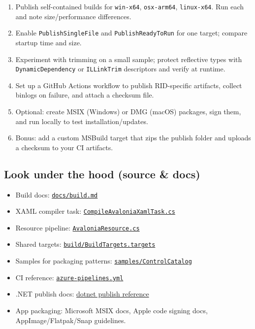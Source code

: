 \begin{enumerate}
\def\labelenumi{\arabic{enumi}.}
\tightlist
\item
  Publish self-contained builds for \passthrough{\lstinline!win-x64!},
  \passthrough{\lstinline!osx-arm64!},
  \passthrough{\lstinline!linux-x64!}. Run each and note
  size/performance differences.
\item
  Enable \passthrough{\lstinline!PublishSingleFile!} and
  \passthrough{\lstinline!PublishReadyToRun!} for one target; compare
  startup time and size.
\item
  Experiment with trimming on a small sample; protect reflective types
  with \passthrough{\lstinline!DynamicDependency!} or
  \passthrough{\lstinline!ILLinkTrim!} descriptors and verify at
  runtime.
\item
  Set up a GitHub Actions workflow to publish RID-specific artifacts,
  collect binlogs on failure, and attach a checksum file.
\item
  Optional: create MSIX (Windows) or DMG (macOS) packages, sign them,
  and run locally to test installation/updates.
\item
  Bonus: add a custom MSBuild target that zips the publish folder and
  uploads a checksum to your CI artifacts.
\end{enumerate}

\subsection{Look under the hood (source \&
docs)}\label{look-under-the-hood-source-docs}

\begin{itemize}
\tightlist
\item
  Build docs:
  \href{https://github.com/AvaloniaUI/Avalonia/blob/master/docs/build.md}{\passthrough{\lstinline!docs/build.md!}}
\item
  XAML compiler task:
  \href{https://github.com/AvaloniaUI/Avalonia/blob/master/src/Avalonia.Build.Tasks/CompileAvaloniaXamlTask.cs}{\passthrough{\lstinline!CompileAvaloniaXamlTask.cs!}}
\item
  Resource pipeline:
  \href{https://github.com/AvaloniaUI/Avalonia/blob/master/src/Avalonia.Build.Tasks/AvaloniaResource.cs}{\passthrough{\lstinline!AvaloniaResource.cs!}}
\item
  Shared targets:
  \href{https://github.com/AvaloniaUI/Avalonia/blob/master/build/BuildTargets.targets}{\passthrough{\lstinline!build/BuildTargets.targets!}}
\item
  Samples for packaging patterns:
  \href{https://github.com/AvaloniaUI/Avalonia/tree/master/samples/ControlCatalog}{\passthrough{\lstinline!samples/ControlCatalog!}}
\item
  CI reference:
  \href{https://github.com/AvaloniaUI/Avalonia/blob/master/azure-pipelines.yml}{\passthrough{\lstinline!azure-pipelines.yml!}}
\item
  .NET publish docs:
  \href{https://learn.microsoft.com/dotnet/core/tools/dotnet-publish}{dotnet
  publish reference}
\item
  App packaging: Microsoft MSIX docs, Apple code signing docs,
  AppImage/Flatpak/Snap guidelines.
\end{itemize}

